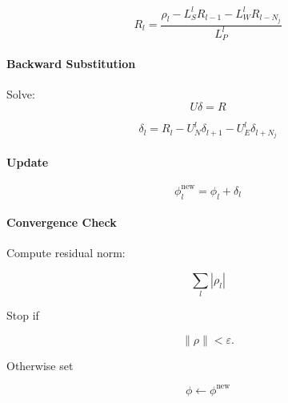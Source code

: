 \documentclass[11pt]{article}
\begin{document}
\[
R_l
=
\frac{
\rho_l
-L_S^lR_{l-1}
-L_W^lR_{l-N_j}
}
{L_P^l}
\]

\paragraph{Backward Substitution}
Solve:
\[
U\delta=R
\]

\[
\delta_l
=
R_l
-U_N^l\delta_{l+1}
-U_E^l\delta_{l+N_j}
\]

\paragraph{Update}
\[
\phi_l^{\text{new}}
=
\phi_l+\delta_l
\]

\paragraph{Convergence Check}

Compute residual norm:

\[
\sum_l |\rho_l|
\]

Stop if

\[
\|\rho\| < \varepsilon.
\]

Otherwise set

\[
\phi \leftarrow \phi^{\text{new}}
\]
\end{document}
